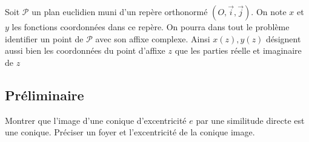 Soit $\mathcal P$ un plan euclidien muni d'un repère orthonormé $(O,\overrightarrow{i},\overrightarrow{j})$. On note $x$ et $y$ les fonctions coordonnées dans ce repère.
On pourra dans tout le problème identifier un point de $\mathcal P$ avec son affixe complexe.  \newline
Ainsi $x(z), y(z)$ désignent aussi bien les coordonnées du point d'affixe $z$ que les parties réelle et imaginaire de $z$ 
\subsection*{Préliminaire}
Montrer que l'image d'une conique d'excentricité $e$ par une similitude directe est une conique. Préciser un foyer et l'excentricité de la conique image.
